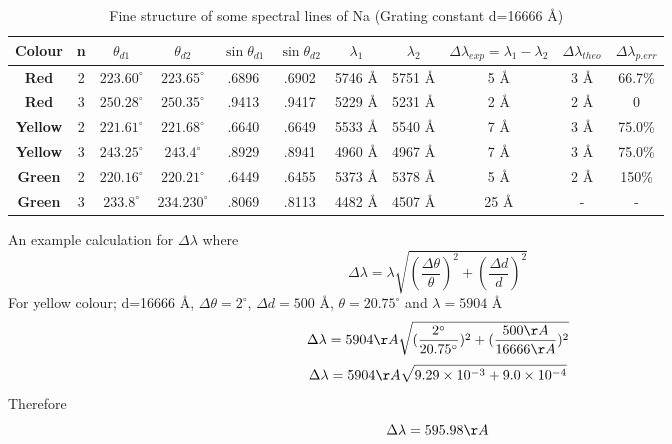 \documentclass[a4paper,12pt]{article}
\begin{document}
\begin{table}[h!]
	
	\begin{center}
\begin{tabular}{|c||c|c|c|c|c|c|c|c|c|c|}
	\hline \textbf{Colour} & n & $\theta_{d1}$ & $\theta_{d2}$ & $\sin\theta_{d1}$ & $\sin\theta_{d2}$ & $\lambda_{1}$ & $\lambda_{2}$ &  $\Delta\lambda_{exp}=\lambda_{1}-\lambda_{2}$ & $\Delta\lambda_{theo}$ & $ \Delta\lambda_{p.err}$ \\ 
	\hline \textbf{Red} & 2 & $223.60^{\circ}$ & $223.65^{\circ}$ & .6896 & .6902 & 5746 \AA & 5751 \AA & 5 \AA & 3 \AA  & 66.7\% \\ 
	\hline \textbf{Red} & 3 & $250.28^{\circ}$ & $250.35^{\circ}$ & .9413 & .9417 & 5229 \AA & 5231 \AA & 2 \AA & 2 \AA & 0 \\ 
	\hline \textbf{Yellow} & 2 & $221.61^{\circ}$ & $221.68^{\circ}$ & .6640 & .6649 & 5533 \AA & 5540 \AA & 7 \AA & 3 \AA & 75.0\% \\ 
	\hline \textbf{Yellow} & 3 & $243.25^{\circ}$ & $243.4^{\circ}$ & .8929 & .8941 & 4960 \AA & 4967 \AA & 7 \AA & 3 \AA & 75.0\% \\ 
	\hline \textbf{Green} & 2 & $220.16^{\circ}$ & $220.21^{\circ}$ & .6449 & .6455 & 5373 \AA & 5378 \AA & 5 \AA & 2 \AA & 150\% \\ 
	\hline \textbf{Green} & 3 & $233.8^{\circ}$ & $234.230^{\circ}$ & .8069 & .8113 & 4482 \AA & 4507 \AA & 25 \AA & - & - \\ 
	\hline 
\end{tabular} 
\caption{Fine structure of some spectral lines of Na (Grating constant d=16666 \AA)}
\end{center}
\end{table}
An example calculation for $\Delta\lambda$ where
\begin{equation}
\Delta\lambda=\lambda\sqrt{(\frac{\Delta\theta}{\theta})^{2}+(\frac{\Delta d}{d})^{2}}
\end{equation}
For yellow colour; d=16666 \AA, $\Delta\theta=2^{\circ}$, $\Delta d =500$ \AA, $\theta=20.75^{\circ}$ and $\lambda=5904$ \AA
\newpage
\begin{equation}
\Delta\lambda=5904 \AA \sqrt{(\frac{2^{\circ}}{20.75^{\circ}})^{2}+(\frac{500 \AA }{16666 \AA })^{2}}
\end{equation}
\begin{equation}
\Delta\lambda=5904 \AA \sqrt{9.29\times 10^{-3} + 9.0\times 10^{-4}}
\end{equation}
Therefore
\begin{equation}
\Delta\lambda=595.98 \AA 
\end{equation}
\end{document}
